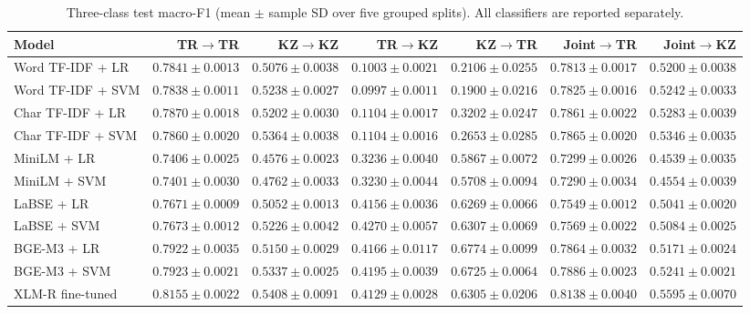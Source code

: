 \begin{table}[t]
\centering
\small
\caption{Three-class test macro-F1 (mean $\pm$ sample SD over five grouped splits). All classifiers are reported separately.}
\label{tab:revised_main_results}
\begin{tabular}{lrrrrrr}
\hline
Model & TR$\to$TR & KZ$\to$KZ & TR$\to$KZ & KZ$\to$TR & Joint$\to$TR & Joint$\to$KZ \\
\hline
Word TF-IDF + LR & $0.7841 \pm 0.0013$ & $0.5076 \pm 0.0038$ & $0.1003 \pm 0.0021$ & $0.2106 \pm 0.0255$ & $0.7813 \pm 0.0017$ & $0.5200 \pm 0.0038$ \\
Word TF-IDF + SVM & $0.7838 \pm 0.0011$ & $0.5238 \pm 0.0027$ & $0.0997 \pm 0.0011$ & $0.1900 \pm 0.0216$ & $0.7825 \pm 0.0016$ & $0.5242 \pm 0.0033$ \\
Char TF-IDF + LR & $0.7870 \pm 0.0018$ & $0.5202 \pm 0.0030$ & $0.1104 \pm 0.0017$ & $0.3202 \pm 0.0247$ & $0.7861 \pm 0.0022$ & $0.5283 \pm 0.0039$ \\
Char TF-IDF + SVM & $0.7860 \pm 0.0020$ & $0.5364 \pm 0.0038$ & $0.1104 \pm 0.0016$ & $0.2653 \pm 0.0285$ & $0.7865 \pm 0.0020$ & $0.5346 \pm 0.0035$ \\
MiniLM + LR & $0.7406 \pm 0.0025$ & $0.4576 \pm 0.0023$ & $0.3236 \pm 0.0040$ & $0.5867 \pm 0.0072$ & $0.7299 \pm 0.0026$ & $0.4539 \pm 0.0035$ \\
MiniLM + SVM & $0.7401 \pm 0.0030$ & $0.4762 \pm 0.0033$ & $0.3230 \pm 0.0044$ & $0.5708 \pm 0.0094$ & $0.7290 \pm 0.0034$ & $0.4554 \pm 0.0039$ \\
LaBSE + LR & $0.7671 \pm 0.0009$ & $0.5052 \pm 0.0013$ & $0.4156 \pm 0.0036$ & $0.6269 \pm 0.0066$ & $0.7549 \pm 0.0012$ & $0.5041 \pm 0.0020$ \\
LaBSE + SVM & $0.7673 \pm 0.0012$ & $0.5226 \pm 0.0042$ & $0.4270 \pm 0.0057$ & $0.6307 \pm 0.0069$ & $0.7569 \pm 0.0022$ & $0.5084 \pm 0.0025$ \\
BGE-M3 + LR & $0.7922 \pm 0.0035$ & $0.5150 \pm 0.0029$ & $0.4166 \pm 0.0117$ & $0.6774 \pm 0.0099$ & $0.7864 \pm 0.0032$ & $0.5171 \pm 0.0024$ \\
BGE-M3 + SVM & $0.7923 \pm 0.0021$ & $0.5337 \pm 0.0025$ & $0.4195 \pm 0.0039$ & $0.6725 \pm 0.0064$ & $0.7886 \pm 0.0023$ & $0.5241 \pm 0.0021$ \\
XLM-R fine-tuned & $0.8155 \pm 0.0022$ & $0.5408 \pm 0.0091$ & $0.4129 \pm 0.0028$ & $0.6305 \pm 0.0206$ & $0.8138 \pm 0.0040$ & $0.5595 \pm 0.0070$ \\
\hline
\end{tabular}
\end{table}
